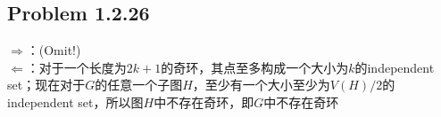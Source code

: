 \subsection*{Problem 1.2.26}
$\Rightarrow$：(Omit!) \\
\indent $\Leftarrow$：对于一个长度为$2k + 1$的奇环，其点至多构成一个大小为$k$的independent set；现在对于$G$的任意一个子图$H$，至少有一个大小至少为$V(H)/2$的independent set，所以图$H$中不存在奇环，即$G$中不存在奇环

